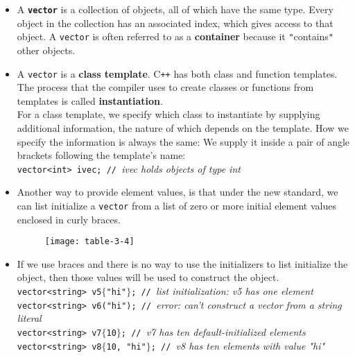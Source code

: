 \begin{itemize}
\item
A \textbf{\texttt{vector}} is a collection of objects, all of which have the same type. Every object in the collection has an associated index, which gives access to that object. A \texttt{vector} is often referred to as a \textbf{container} because it \texttt{"}contains\texttt{"} other objects.

\item
A \texttt{vector} is a \textbf{class template}. C\texttt{++} has both class and function templates.\\
The process that the compiler uses to create classes or functions from templates is called \textbf{instantiation}.\\
For a class template, we specify which class to instantiate by supplying additional information, the nature of which depends on the template. How we specify the information is always the same: We supply it inside a pair of angle brackets following the template's name:\\
\hspace*{1em}\texttt{vector<int> ivec; // }\textit{ivec holds objects of type int}

\item
Another way to provide element values, is that under the new standard, we can list initialize a \texttt{vector} from a list of zero or more initial element values enclosed in curly braces.

\begin{figure}[ht]
\texttt{[image: table-3-4]}
\centering
\end{figure}

\item
If we use braces and there is no way to use the initializers to list initialize the object, then those values will be used to construct the object.\\
\hspace*{1em}\texttt{vector<string> v5$\{$"hi"$\}$; // }\textit{list initialization: v5 has one element}\\
\hspace*{1em}\texttt{vector<string> v6("hi"); // }\textit{error: can't construct a vector from a string literal}\\
\hspace*{1em}\texttt{vector<string> v7$\{$10$\}$; // }\textit{v7 has ten default-initialized elements}\\
\hspace*{1em}\texttt{vector<string> v8$\{$10, "hi"$\}$; // }\textit{v8 has ten elements with value "hi"}


\end{itemize}
